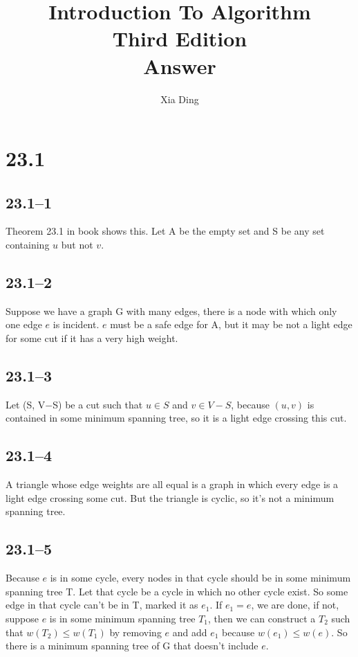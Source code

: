 \documentclass{article}
\author{Xia Ding}
\title{\textbf{Introduction To Algorithm}\\Third Edition\\\textbf{Answer}}
\begin{document}
\maketitle
\section*{23.1}
\subsection*{23.1--1}
Theorem 23.1 in book shows this. Let A be the empty set and S be any set
containing $u$ but not $v$.

\subsection*{23.1--2}
Suppose we have a graph G with many edges, there is a node with which only
one edge $e$ is incident. $e$ must be a safe edge for A, but it may be not a
light edge for some cut if it has a very high weight.

\subsection*{23.1--3}
Let (S, V$-$S) be a cut such that $u\in{S}$ and $v\in{V-S}$, because $(u, v)$
is contained in some minimum spanning tree, so it is a light edge crossing
this cut.

\subsection*{23.1--4}
A triangle whose edge weights are all equal is a graph in which every edge
is a light edge crossing some cut. But the triangle is cyclic, so it's not
a minimum spanning tree.

\subsection*{23.1--5}
Because $e$ is in some cycle, every nodes in that cycle should be in some
minimum spanning tree T. Let that cycle be a cycle in which no other cycle exist. So some edge in that cycle can't be in T, marked it as $e_1$. If $e_1 = e$,
we are done, if not, suppose $e$ is in some minimum spanning tree $T_1$, then
we can construct a $T_2$ such that $w(T_2) \le w(T_1)$ by removing $e$ and add
$e_1$ because $w(e_1) \le w(e)$. So there is a minimum spanning tree of G that
doesn't include $e$.
\end{document}
